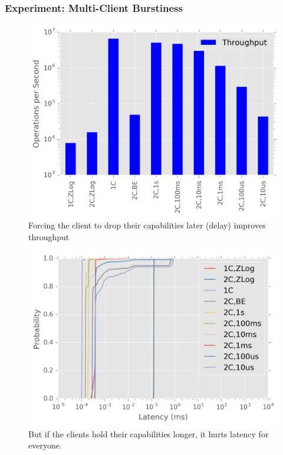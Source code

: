 \documentclass[10pt,twocolumn]{article}
\begin{document}
\subsubsection{Experiment: Multi-Client
Burstiness}\label{experiment-multi-client-burstiness}

\begin{figure}[htbp]
\centering
\includegraphics{figures/caps-delay-thruput.png}
\caption{Forcing the client to drop their capabilities later (delay)
improves throughput}
\end{figure}

\begin{figure}[htbp]
\centering
\includegraphics{figures/caps-delay-latency.png}
\caption{But if the clients hold their capabilities longer, it hurts
latency for everyone.}
\end{figure}
\end{document}
